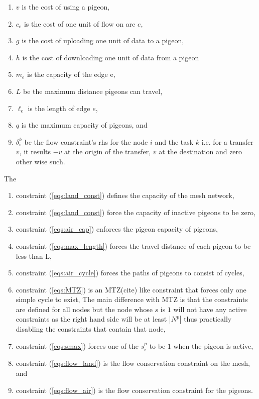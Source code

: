 \documentclass{article}
\begin{document}
	\begin{enumerate}
	\item $v$ is the cost of using a pigeon,
	\item $c_e$ is the cost of one unit of flow on arc $e$,
	\item $g$ is the cost of uploading one unit of data to a pigeon,
	\item $h$ is the cost of downloading one unit of data from a pigeon
	\item $m_e$ is the capacity of the edge e,  
	
	\item $L$ be the maximum distance pigeons can travel,
	\item $\ell_e$ is the length of edge $e$,
	\item $q$ is the maximum capacity of pigeons, and
	\item $\delta^k_{i}$ be the flow constraint's rhs for the node $i$ and the task $k$ i.e. for a transfer $v$, it results $-v$ at the origin of the transfer, $v$ at the destination and zero other wise such.
	\end{enumerate}
	The  
	\begin{enumerate}
		\item constraint (\ref{eqs:land_const}) defines the capacity of the mesh network, 
		\item constraint (\ref{eqs:land_const}) force the capacity of inactive pigeons to be zero,
		\item constraint (\ref{eqs:air_cap}) enforces the pigeon capacity of pigeons,
		\item constraint (\ref{eqs:max_length}) forces the travel distance of each pigeon to be less than L,
		\item constraint (\ref{eqs:air_cycle}) forces the paths of pigeons to consist of cycles,
		\item constraint (\ref{eqs:MTZ}) is an MTZ(cite) like constraint that forces only one simple cycle to exist, The main difference with MTZ is that the constraints are defined for all nodes but the node whose $s$ is $1$ will not have any active constraints as the right hand side will be at least $|N^p|$ thus practically disabling the constraints that contain that node,
		\item constraint (\ref{eqs:smax}) forces one of the $s^p_i$ to be $1$ when the pigeon is active,
		\item constraint (\ref{eqs:flow_land}) is the flow conservation constraint on the mesh, and 
		\item constraint (\ref{eqs:flow_air}) is the flow conservation constraint for the pigeons.
	\end{enumerate}
\end{document}
